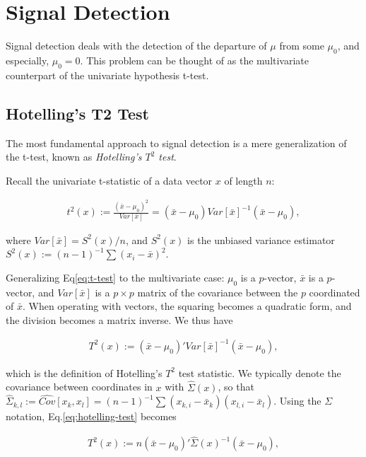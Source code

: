 \documentclass[]{book}
\theoremstyle{definition}
\theoremstyle{definition}
\theoremstyle{definition}
\theoremstyle{remark}
\begin{document}
\section{Signal Detection}\label{signal-detection}

Signal detection deals with the detection of the departure of \(\mu\)
from some \(\mu_0\), and especially, \(\mu_0=0\). This problem can be
thought of as the multivariate counterpart of the univariate hypothesis
t-test.

\subsection{Hotelling's T2 Test}\label{hotellings-t2-test}

The most fundamental approach to signal detection is a mere
generalization of the t-test, known as \emph{Hotelling's \(T^2\) test}.

Recall the univariate t-statistic of a data vector \(x\) of length
\(n\):

\begin{align}
  t^2(x):= \frac{(\bar{x}-\mu_0)^2}{Var[\bar{x}]}= (\bar{x}-\mu_0)Var[\bar{x}]^{-1}(\bar{x}-\mu_0),
  \label{eq:t-test}
\end{align}

where \(Var[\bar{x}]=S^2(x)/n\), and \(S^2(x)\) is the unbiased variance
estimator \(S^2(x):=(n-1)^{-1}\sum (x_i-\bar x)^2\).

Generalizing Eq\eqref{eq:t-test} to the multivariate case: \(\mu_0\) is a
\(p\)-vector, \(\bar x\) is a \(p\)-vector, and \(Var[\bar x]\) is a
\(p \times p\) matrix of the covariance between the \(p\) coordinated of
\(\bar x\). When operating with vectors, the squaring becomes a
quadratic form, and the division becomes a matrix inverse. We thus have

\begin{align}
  T^2(x):= (\bar{x}-\mu_0)' Var[\bar{x}]^{-1} (\bar{x}-\mu_0),
  \label{eq:hotelling-test}
\end{align}

which is the definition of Hotelling's \(T^2\) test statistic. We
typically denote the covariance between coordinates in \(x\) with
\(\hat \Sigma(x)\), so that
\(\widehat \Sigma_{k,l}:=\widehat {Cov}[x_k,x_l]=(n-1)^{-1} \sum (x_{k,i}-\bar x_k)(x_{l,i}-\bar x_l)\).
Using the \(\Sigma\) notation, Eq.\eqref{eq:hotelling-test} becomes

\begin{align}
  T^2(x):= n (\bar{x}-\mu_0)' \hat \Sigma(x)^{-1} (\bar{x}-\mu_0),
\end{align}
\end{document}

